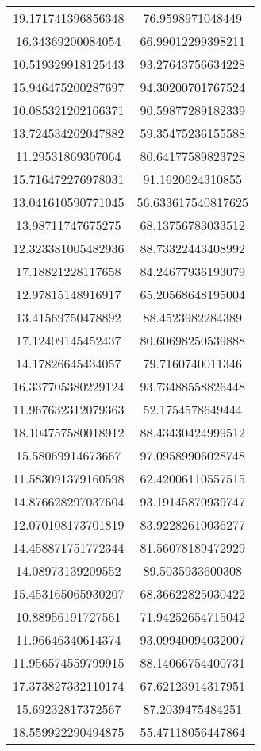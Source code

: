 \begin{table}
\begin{tabular}{cc}
19.171741396856348 & 76.9598971048449 \\
16.34369200084054 & 66.99012299398211 \\
10.519329918125443 & 93.27643756634228 \\
15.946475200287697 & 94.30200701767524 \\
10.085321202166371 & 90.59877289182339 \\
13.724534262047882 & 59.35475236155588 \\
11.29531869307064 & 80.64177589823728 \\
15.716472276978031 & 91.1620624310855 \\
13.041610590771045 & 56.633617540817625 \\
13.98711747675275 & 68.13756783033512 \\
12.323381005482936 & 88.73322443408992 \\
17.18821228117658 & 84.24677936193079 \\
12.97815148916917 & 65.20568648195004 \\
13.41569750478892 & 88.4523982284389 \\
17.12409145452437 & 80.60698250539888 \\
14.17826645434057 & 79.7160740011346 \\
16.337705380229124 & 93.73488558826448 \\
11.967632312079363 & 52.1754578649444 \\
18.104757580018912 & 88.43430424999512 \\
15.58069914673667 & 97.09589906028748 \\
11.583091379160598 & 62.42006110557515 \\
14.876628297037604 & 93.19145870939747 \\
12.070108173701819 & 83.92282610036277 \\
14.458871751772344 & 81.56078189472929 \\
14.08973139209552 & 89.5035933600308 \\
15.453165065930207 & 68.36622825030422 \\
10.88956191727561 & 71.94252654715042 \\
11.96646340614374 & 93.09940094032007 \\
11.956574559799915 & 88.14066754400731 \\
17.373827332110174 & 67.62123914317951 \\
15.69232817372567 & 87.2039475484251 \\
18.559922290494875 & 55.47118056447864 \\

\end{tabular}
\end{table}

